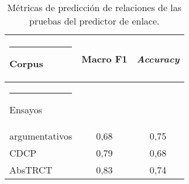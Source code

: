 \documentclass[a4paper,11pt,twocolumn,twoside]{article}
\begin{document}
\begin{table}[h]
	\begin{center}
		\begin{tabular}{|l|c|c|} 
			\hline\rule{-2pt}{15pt}
			{\bf Corpus}                 & {\bf Macro F1}  & {\bf \textit{Accuracy}} \\
			\hline\rule{-4pt}{10pt}
			Ensayos 			 		 & 	               & 	                    \\ 
			argumentativos 				 & 0,68            & 0,75                   \\ 
			CDCP                   		 & 0,79            & 0,68                   \\ 
			AbsTRCT               		 & 0,83            & 0,74                   \\ 
			\hline
		\end{tabular}
	\end{center}
	\caption{\label{table:test_relation_metrics_link_predictor_link_prediction}Métricas de predicción de relaciones de las pruebas del predictor de enlace.}
\end{table}


\end{document}
